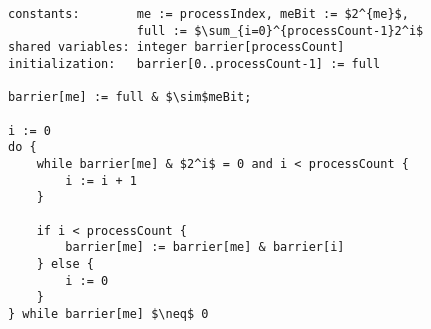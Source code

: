 \begin{lstlisting}[mathescape]
constants:        me := processIndex, meBit := $2^{me}$,
                  full := $\sum_{i=0}^{processCount-1}2^i$
shared variables: integer barrier[processCount]
initialization:   barrier[0..processCount-1] := full

barrier[me] := full & $\sim$meBit;

i := 0
do {
	while barrier[me] & $2^i$ = 0 and i < processCount {
		i := i + 1
	}

	if i < processCount {
		barrier[me] := barrier[me] & barrier[i]
	} else {
		i := 0
	}
} while barrier[me] $\neq$ 0
\end{lstlisting}
